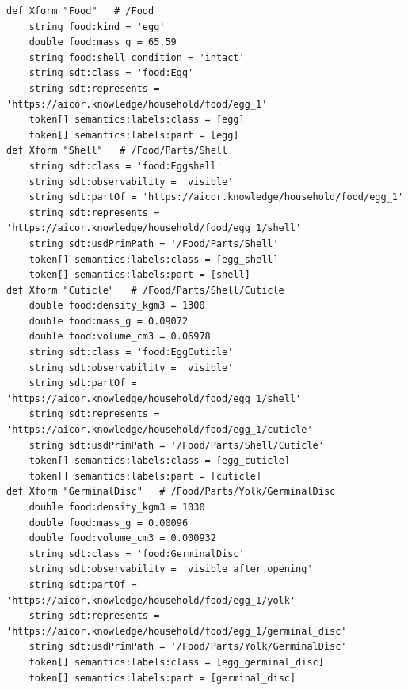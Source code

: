 \documentclass[10.5pt,a4paper]{article}
\begin{document}
\par\medskip{}\par\nopagebreak\vspace{2pt}\begin{Verbatim}[fontsize=\scriptsize,frame=lines,framesep=2mm,breaklines]
def Xform "Food"   # /Food
    string food:kind = 'egg'
    double food:mass_g = 65.59
    string food:shell_condition = 'intact'
    string sdt:class = 'food:Egg'
    string sdt:represents = 'https://aicor.knowledge/household/food/egg_1'
    token[] semantics:labels:class = [egg]
    token[] semantics:labels:part = [egg]
def Xform "Shell"   # /Food/Parts/Shell
    string sdt:class = 'food:Eggshell'
    string sdt:observability = 'visible'
    string sdt:partOf = 'https://aicor.knowledge/household/food/egg_1'
    string sdt:represents = 'https://aicor.knowledge/household/food/egg_1/shell'
    string sdt:usdPrimPath = '/Food/Parts/Shell'
    token[] semantics:labels:class = [egg_shell]
    token[] semantics:labels:part = [shell]
def Xform "Cuticle"   # /Food/Parts/Shell/Cuticle
    double food:density_kgm3 = 1300
    double food:mass_g = 0.09072
    double food:volume_cm3 = 0.06978
    string sdt:class = 'food:EggCuticle'
    string sdt:observability = 'visible'
    string sdt:partOf = 'https://aicor.knowledge/household/food/egg_1/shell'
    string sdt:represents = 'https://aicor.knowledge/household/food/egg_1/cuticle'
    string sdt:usdPrimPath = '/Food/Parts/Shell/Cuticle'
    token[] semantics:labels:class = [egg_cuticle]
    token[] semantics:labels:part = [cuticle]
def Xform "GerminalDisc"   # /Food/Parts/Yolk/GerminalDisc
    double food:density_kgm3 = 1030
    double food:mass_g = 0.00096
    double food:volume_cm3 = 0.000932
    string sdt:class = 'food:GerminalDisc'
    string sdt:observability = 'visible after opening'
    string sdt:partOf = 'https://aicor.knowledge/household/food/egg_1/yolk'
    string sdt:represents = 'https://aicor.knowledge/household/food/egg_1/germinal_disc'
    string sdt:usdPrimPath = '/Food/Parts/Yolk/GerminalDisc'
    token[] semantics:labels:class = [egg_germinal_disc]
    token[] semantics:labels:part = [germinal_disc]
\end{Verbatim}
\end{document}
